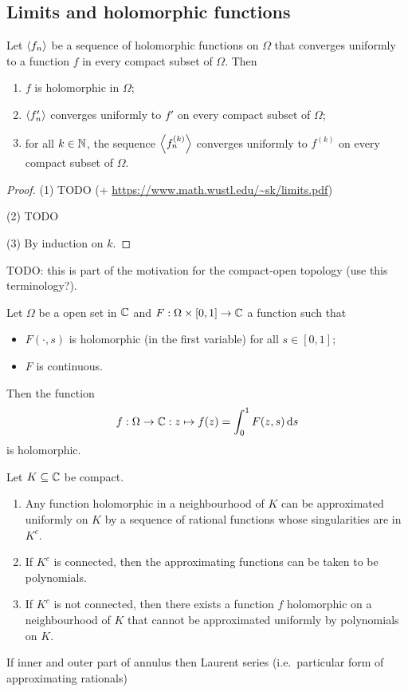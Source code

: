 \subsection{Limits and holomorphic functions}
\begin{proposition}
Let $\left\langle f_n \right\rangle$ be a sequence of holomorphic functions on $\Omega$ that converges uniformly to a function $f$ in every compact subset of $\Omega$. Then
\begin{enumerate}
\item $f$ is holomorphic in $\Omega$;
\item $\left\langle f_n' \right\rangle$ converges uniformly to $f'$ on every compact subset of $\Omega$;
\item for all $k\in \mathbb{N}$, the sequence $\left\langle f_n^{(k)} \right\rangle$ converges uniformly to $f^{(k)}$ on every compact subset of $\Omega$.
\end{enumerate}
\end{proposition}
\begin{proof}
(1) TODO (+ \url{https://www.math.wustl.edu/~sk/limits.pdf})

(2) TODO

(3) By induction on $k$.
\end{proof}
TODO: this is part of the motivation for the compact-open topology (use this terminology?).

\begin{proposition}
Let $\Omega$ be a open set in $\mathbb{C}$ and $F: \Omega\times[0,1]\to \mathbb{C}$ a function such that
\begin{itemize}
\item $F(\cdot,s)$ is holomorphic (in the first variable) for all $s\in [0,1]$;
\item $F$ is continuous.
\end{itemize}
Then the function
\[ f: \Omega \to \mathbb{C}: z\mapsto f(z) = \int_0^1F(z,s)\operatorname{d \!}{s} \]
is holomorphic.
\end{proposition}

\begin{proposition}
Let $K\subseteq \mathbb{C}$ be compact.
\begin{enumerate}
\item Any function holomorphic in a neighbourhood of $K$ can be approximated uniformly on $K$ by a sequence of rational functions whose singularities are in $K^c$.
\item If $K^c$ is connected, then the approximating functions can be taken to be polynomials.
\item If $K^c$ is not connected, then there exists a function $f$ holomorphic on a neighbourhood of $K$ that cannot be approximated uniformly by polynomials on $K$.
\end{enumerate}
\end{proposition}
If inner and outer part of annulus then Laurent series (i.e.\ particular form of approximating rationals)


